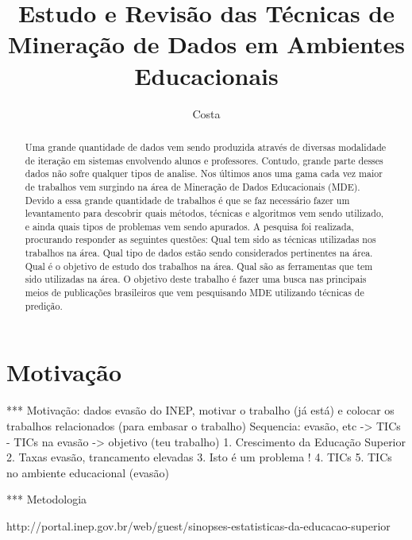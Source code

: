 \documentclass[diss-proposta,nocipinfo]{texufpel}
\title{Estudo e Revisão das Técnicas de Mineração de Dados em Ambientes Educacionais}
\author{Costa}{Alexandre Gomes da}
\begin{document}
\maketitle 
\sloppy

\begin{abstract}
Uma grande quantidade de dados vem sendo produzida através de diversas modalidade de iteração em sistemas envolvendo alunos e professores. Contudo, grande parte desses dados não sofre qualquer tipos de analise. Nos últimos anos uma gama cada vez maior de trabalhos vem surgindo na área de Mineração de Dados Educacionais (MDE). Devido a essa grande quantidade de trabalhos é que se faz necessário fazer um levantamento para descobrir quais métodos, técnicas e algoritmos vem sendo utilizado, e ainda quais tipos de problemas vem sendo apurados. A pesquisa foi realizada, procurando responder as seguintes questões: Qual tem sido as técnicas utilizadas nos trabalhos na área. Qual tipo de dados estão sendo considerados pertinentes na área. Qual é o objetivo de estudo dos trabalhos na área. Qual são as ferramentas que tem sido utilizadas na área. O objetivo deste trabalho é fazer uma busca nas principais meios de publicações brasileiros que vem pesquisando MDE utilizando técnicas de predição.
\end{abstract}

\chapter{Motivação}


*** Motivação: dados evasão do INEP, motivar o trabalho (já está) e colocar os trabalhos relacionados (para embasar o trabalho)
Sequencia: evasão, etc -> TICs - TICs na evasão -> objetivo (teu trabalho)
1. Crescimento da Educação Superior
2. Taxas evasão, trancamento elevadas
3. Isto é um problema !
4. TICs
5. TICs no ambiente educacional (evasão)


*** Metodologia

http://portal.inep.gov.br/web/guest/sinopses-estatisticas-da-educacao-superior
\end{document}
